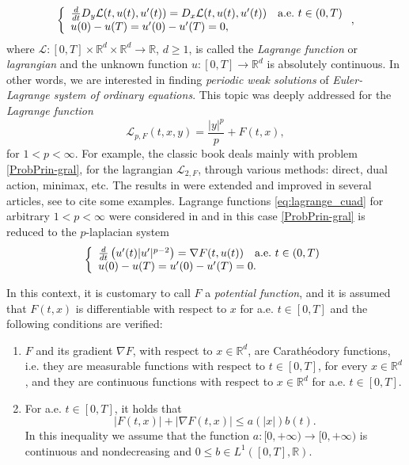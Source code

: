 \documentclass[twoside]{article}
\makeatletter
\theoremstyle{remark}
\newcommand{\labitem}[2]{%
\def\@itemlabel{\textbf{#1}}
\item
\def\@currentlabel{#1}\label{#2}}
\newcommand{\rr}{\mathbb{R}}
\renewcommand{\leq}{\leqslant}
\renewcommand{\geq}{\geqslant}
\newcounter{example}
\makeatother
\begin{document}
\begin{equation}\label{ProbPrin-gral}
    \left\{%
\begin{array}{ll}
  \frac{d}{dt} D_{y}\mathcal{L}(t,u(t),u'(t))= D_{x}\mathcal{L}(t,u(t),u'(t)) \quad \hbox{a.e.}\ t \in (0,T)\\
    u(0)-u(T)=u'(0)-u'(T)=0,
\end{array}%
\right.,
\end{equation}
where $\mathcal{L}:[0,T]\times\rr^d\times\rr^d\to\rr$, $d\geq 1$, is called the \emph{Lagrange function} or \emph{lagrangian} and the unknown function  $u:[0,T]\to\rr^d$ is absolutely continuous. In other words, we are interested in  finding \emph{periodic weak solutions} of \emph{Euler-Lagrange system of ordinary equations}. This topic was deeply addressed for the \emph{Lagrange function}
\begin{equation}\label{eq:lagrange_cuad}
\mathcal{L}_{p,F}(t,x,y)=\frac{|y|^p}{p}+F(t,x),
\end{equation}
for $1<p<\infty$. For example, the classic book  \cite{mawhin2010critical} deals mainly with problem \eqref{ProbPrin-gral}, for the lagrangian $\mathcal{L}_{2,F}$, through various methods: direct, dual action, minimax, etc. The results in \cite{mawhin2010critical} were extended and improved in several articles, see  \cite{tang1995periodic,tang1998periodic,wu1999periodic,tang2001periodic,zhao2004periodic}  to cite some examples. Lagrange functions \eqref{eq:lagrange_cuad} for arbitrary $1<p<\infty$ were considered in  \cite{Tian2007192,tang2010periodic} and in this case \eqref{ProbPrin-gral}  is reduced to the $p$-laplacian system
\begin{equation}\label{ProbP-lapla}
    \left\{%
\begin{array}{ll}
   \frac{d}{dt}\left(u'(t)|u'|^{p-2}\right) = \nabla F(t,u(t)) \quad \hbox{a.e.}\ t \in (0,T)\\
    u(0)-u(T)=u'(0)-u'(T)=0.
\end{array}%
\right.
\end{equation}


In this context, it  is customary to call $F$ a  \emph{potential function}, and it is assumed that $F(t,x)$ is differentiable with respect to $x$ for a.e. $t\in [0,T]$ and the following conditions are verified:
\begin{enumerate}
\labitem{(C)}{item:condicion_c} $F$ and its gradient $\nabla F$, with respect to $x\in\rr^d$,  are  Carath\'eodory functions, i.e. they are measurable functions with respect to $t\in [0,T]$, for every  $x\in\rr^d$, and they are continuous functions with  respect to  $x\in\rr^d$ for a.e. $t \in [0,T]$.
 \labitem{(A)}{item:condicion_a}  For   a.e. $t\in [0,T]$, it holds that
\begin{equation}
|F(t,x)| + |\nabla F(t,x)|  \leq a(|x|)b(t).
\end{equation}
In this inequality we assume that the function  $a:[0,+\infty)\to [0,+\infty)$ is continuous and nondecreasing and $0\leq b\in L^1([0,T],\rr)$.
\end{enumerate}
\end{document}
